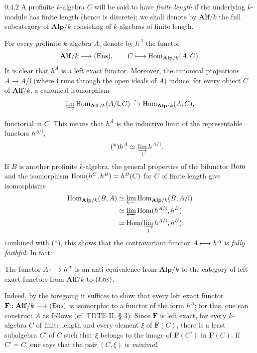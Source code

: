 \begin{definition}{0.4.2}\label{VIIB.0.4.2}
A profinite $k$-algebra $C$ will be said to have \emph{finite length} if the underlying $k$-module has finite length (hence is discrete); we shall denote by $\mathbf{Alf}/k$ the full subcategory of $\mathbf{Alp}/k$ consisting of $k$-algebras of finite length.
\end{definition}
For every profinite $k$-algebra $A$, denote by $h^A$ the functor
\[
\mathbf{Alf}/k\longrightarrow\textup{(Ens)},\qquad C\longmapsto\operatorname{Hom}_{\mathbf{Alp}/k}(A,C).
\]
It is clear that $h^A$ is a left exact functor. Moreover, the canonical projections $A\to A/\mathfrak l$ (where $\mathfrak l$ runs through the open ideals of $A$) induce, for every object $C$ of $\mathbf{Alf}/k$, a canonical isomorphism
\[
\varinjlim_{\mathfrak l}\operatorname{Hom}_{\mathbf{Alf}/k}(A/\mathfrak l,C)\xrightarrow{\sim}\operatorname{Hom}_{\mathbf{Alp}/k}(A,C),
\]
functorial in $C$. This means that $h^A$ is the inductive limit of the representable functors $h^{A/\mathfrak l}$, \ie
\begin{equation}\tag{*}
h^A\simeq\varinjlim_{\mathfrak l}h^{A/\mathfrak l}.
\end{equation}
If $B$ is another profinite $k$-algebra, the general properties of the bifunctor $\operatorname{Hom}$ and the isomorphism $\operatorname{Hom}(h^C,h^B)=h^B(C)$ for $C$ of finite length give isomorphisms
\[
\begin{aligned}
\operatorname{Hom}_{\mathbf{Alp}/k}(B,A)&\simeq\varprojlim\operatorname{Hom}_{\mathbf{Alp}/k}(B,A/\mathfrak l)\\
&\simeq\varprojlim\operatorname{Hom}(h^{A/\mathfrak l},h^B)\\
&\simeq\operatorname{Hom}(\varinjlim_{\mathfrak l}h^{A/\mathfrak l},h^B);
\end{aligned}
\]
combined with (*), this shows that the contravariant functor $A\longmapsto h^A$ is \emph{fully faithful}. In fact:
\begin{proposition}{}
The functor $A\longmapsto h^A$ is an anti-equivalence from $\mathbf{Alp}/k$ to the category of left exact functors from $\mathbf{Alf}/k$ to $\textup{(Ens)}$.
\end{proposition}
Indeed, by the foregoing it suffices to show that every left exact functor $\mathbf F:\mathbf{Alf}/k\longrightarrow\textup{(Ens)}$ is isomorphic to a functor of the form $h^A$; for this, one can construct $A$ as follows (cf. TDTE II, § 3).
Since $\mathbf F$ is left exact, for every $k$-algebra $C$ of finite length and every element $\xi$ of $\mathbf F(C)$, there is a least subalgebra $C'$ of $C$ such that $\xi$ belongs to the image of $\mathbf F(C')$ in $\mathbf F(C)$. If $C'=C$, one says that the pair $(C,\xi)$ is \emph{minimal}.
